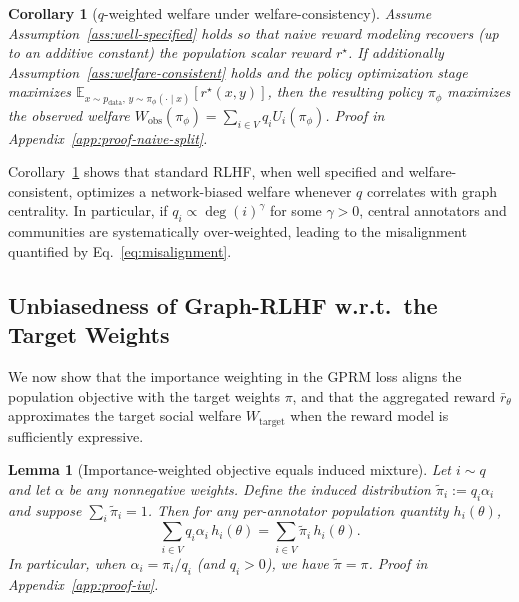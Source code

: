 \documentclass{article}
\theoremstyle{plain}
\newtheorem{lemma}[theorem]{Lemma}
\newtheorem{corollary}[theorem]{Corollary}
\theoremstyle{definition}
\theoremstyle{remark}
\begin{document}
\begin{corollary}[$q$-weighted welfare under welfare-consistency]
\label{cor:naive-q-weighted-welfare}
Assume Assumption~\ref{ass:well-specified} holds so that naive reward modeling
recovers (up to an additive constant) the population scalar reward $r^\star$.
If additionally Assumption~\ref{ass:welfare-consistent} holds and the policy
optimization stage maximizes $\mathbb{E}_{x\sim p_{\mathrm{data}},\,y\sim\pi_\phi(\cdot\mid x)}[r^\star(x,y)]$,
then the resulting policy $\pi_\phi$ maximizes the observed welfare
$W_{\mathrm{obs}}(\pi_\phi)=\sum_{i\in V} q_i U_i(\pi_\phi)$. Proof in Appendix~\ref{app:proof-naive-split}.
\end{corollary}

Corollary~\ref{cor:naive-q-weighted-welfare} shows that standard RLHF, when well
specified and welfare-consistent, optimizes a network-biased welfare whenever
$q$ correlates with graph centrality. In particular, if $q_i \propto \deg(i)^\gamma$ for some
$\gamma > 0$, central annotators and communities are systematically
over-weighted, leading to the misalignment quantified by
Eq.~\eqref{eq:misalignment}.

\subsection{Unbiasedness of Graph-RLHF w.r.t.\ the Target Weights}
\label{subsec:theory-unbiased}

We now show that the importance weighting in the GPRM loss aligns the
population objective with the target weights $\pi$, and that the aggregated
reward $\bar r_\theta$ approximates the target social welfare
$W_{\text{target}}$ when the reward model is sufficiently expressive.

\begin{lemma}[Importance-weighted objective equals induced mixture]
\label{lem:iw-identity}
Let $i \sim q$ and let $\alpha$ be any nonnegative weights. Define the
induced distribution $\tilde\pi_i := q_i \alpha_i$ and suppose
$\sum_i \tilde\pi_i = 1$. Then for any per-annotator population quantity
$h_i(\theta)$,
\begin{equation}
    \sum_{i \in V} q_i \alpha_i \, h_i(\theta)
    =
    \sum_{i \in V} \tilde\pi_i \, h_i(\theta).
    \label{eq:iw-identity}
\end{equation}
In particular, when $\alpha_i = \pi_i / q_i$ (and $q_i > 0$), we have
$\tilde\pi = \pi$. Proof in Appendix~\ref{app:proof-iw}.
\end{lemma} 
\end{document}
